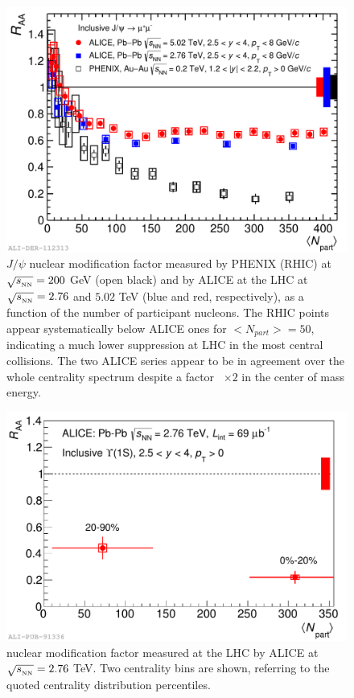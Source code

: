 \begin{figure}[!t]
\begin{center}
\includegraphics[width=0.8\linewidth]{Chapters/Analysis/Figs/2016-Sep-15-RAA_centr_Alice5_Alice276_Phenix.pdf}
\caption{$J/\psi$ nuclear modification factor measured by PHENIX (RHIC) at $\sqrt{s_{_{\rm NN}}}=200$ GeV (open black) and by ALICE at the LHC at $\sqrt{s_{_{\rm NN}}}=2.76$ and $5.02$ TeV (blue and red, respectively), as a function of the number of participant nucleons. The RHIC points appear systematically below ALICE ones for $<N_{part}>=50$, indicating a much lower suppression at LHC in the most central collisions. The two ALICE series appear to be in agreement over the whole centrality spectrum despite a factor ~$\times2$ in the center of mass energy. }
\label{fig:LHC_RHIC_jpsi}
\end{center}
\end{figure}

\begin{figure}[!t]
\begin{center}
\includegraphics[width=0.8\linewidth]{Chapters/Analysis/Figs/2014-Dec-16-Raa_centr.pdf}
\caption{\upsi nuclear modification factor measured at the LHC by ALICE at $\sqrt{s_{_{\rm NN}}}=2.76$ TeV. Two centrality bins are shown, referring to the quoted centrality distribution percentiles.}
\label{fig:LHC_upsi}
\end{center}
\end{figure}

